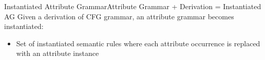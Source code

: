





\begin{frame}{Instantiated Attribute Grammar}{Attribute Grammar + Derivation = Instantiated AG}
Given a \alert{derivation} of CFG grammar, an attribute grammar becomes \alert{instantiated}:
\begin{itemize}
    \item Set of \alert{instantiated semantic rules} where each attribute \alert{occurrence} is replaced with an \alert{attribute instance}
\end{itemize}

\end{frame}


